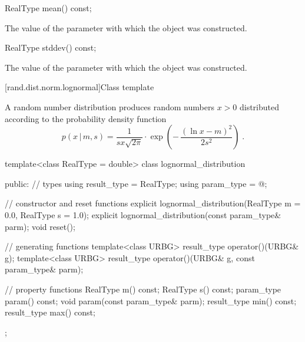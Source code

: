 %
\begin{itemdecl}
RealType mean() const;
\end{itemdecl}

\begin{itemdescr}
\pnum\returns The value of the  parameter
 with which the object was constructed.
\end{itemdescr}

%
\begin{itemdecl}
RealType stddev() const;
\end{itemdecl}

\begin{itemdescr}
\pnum\returns The value of the  parameter
 with which the object was constructed.
\end{itemdescr}


[rand.dist.norm.lognormal]{Class template }%
%
%

\pnum
A  random number distribution
produces random numbers $ x > 0 $
distributed according to
the probability density function%
%
%
\[%
 p(x\,|\,m,s)
      = \frac{1}
             {s x \sqrt{2 \pi}}
        \cdot
        \exp{\left(- \, \frac{(\ln{x} - m)^2}
                             {2 s^2}
             \right)
            }
\; \mbox{.}
\]

%
\begin{codeblock}
template<class RealType = double>
 class lognormal_distribution
{
public:
 // types
 using result_type = RealType;
 using param_type  = @\unspec@;

 // constructor and reset functions
 explicit lognormal_distribution(RealType m = 0.0, RealType s = 1.0);
 explicit lognormal_distribution(const param_type& parm);
 void reset();

 // generating functions
 template<class URBG>
   result_type operator()(URBG& g);
 template<class URBG>
   result_type operator()(URBG& g, const param_type& parm);

 // property functions
 RealType m() const;
 RealType s() const;
 param_type param() const;
 void param(const param_type& parm);
 result_type min() const;
 result_type max() const;
};
\end{codeblock}


